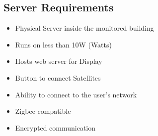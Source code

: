 \subsection{Server Requirements}
\begin{itemize}
 \item Physical Server inside the monitored building
 \item Runs on less than 10W (Watts)
 \item Hosts web server for Display
 \item Button to connect Satellites
 \item Ability to connect to the user's network
 \item Zigbee compatible
 \item Encrypted communication
\end{itemize}

